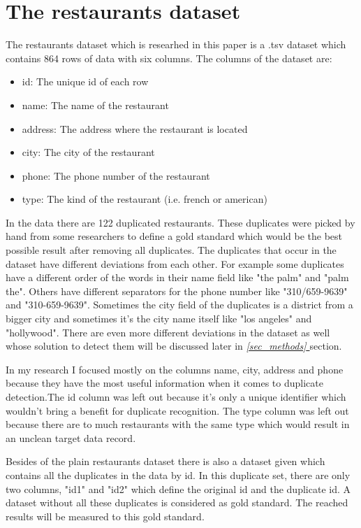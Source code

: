 \documentclass[conference]{IEEEtran}
\newcommand*{\fullref}[1]{\textit{\hyperref[{#1}]{\autoref*{#1} \nameref*{#1}}}}
\begin{document}
\section{The restaurants dataset}
The restaurants dataset which is researhed in this paper is a .tsv dataset which contains 864 rows of data with six columns. The columns of the dataset are: 
\begin{itemize}
	\item id: The unique id of each row
	\item name: The name of the restaurant
	\item address: The address where the restaurant is located
	\item city: The city of the restaurant
	\item phone: The phone number of the restaurant
	\item type: The kind of the restaurant (i.e. french or american)
\end{itemize}
In the data there are 122 duplicated restaurants. These duplicates were picked by hand from some researchers to define a gold standard which would be the best possible result after removing all duplicates. The duplicates that occur in the dataset have different deviations from each other. For example some duplicates have a different order of the words in their name field like "the palm" and "palm the". Others have different separators for the phone number like "310/659-9639" and "310-659-9639". Sometimes the city field of the duplicates is a district from a bigger city and sometimes it's the city name itself like "los angeles" and "hollywood". There are even more  different deviations in the dataset as well whose solution to detect them will be discussed later in \fullref{sec_methods} section.

In my research I focused mostly on the columns name, city, address and phone because they have the most useful information when it comes to duplicate detection.The id column was left out because it's only a unique identifier which wouldn't bring a benefit for duplicate recognition. The type column was left out because there are to much restaurants with the same type which would result in an unclean target data record.

Besides of the plain restaurants dataset there is also a dataset given which contains all the duplicates in the data by id. In this duplicate set, there are only two columns, "id1" and "id2" which define the original id and the duplicate id. A dataset without all these duplicates is considered as gold standard. The reached results will be measured to this gold standard.
\end{document}
